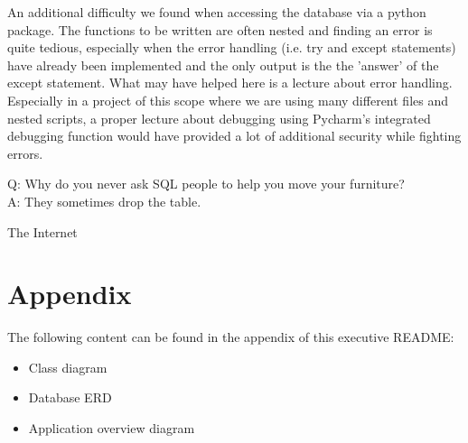 \documentclass[11pt,a4paper,notitlepage]{article}
\begin{document}
An additional difficulty we found when accessing the database via a python package. The functions to be written are often nested and finding an error is quite tedious, especially when the error handling (i.e. try and except statements) have already been implemented and the only output is the the 'answer' of the except statement. What may have helped here is a lecture about error handling. Especially in a project of this scope where we are using many different files and nested scripts, a proper lecture about debugging using Pycharm's integrated debugging function would have provided a lot of additional security while fighting errors.

\epigraph{Q: Why do you never ask SQL people to help you move your furniture?\\ A: They sometimes drop the table.}{The Internet}
\section*{Appendix}
The following content can be found in the appendix of this executive README:
\begin{itemize}
\item Class diagram
\item Database ERD
\item Application overview diagram
\end{itemize}
\end{document}
